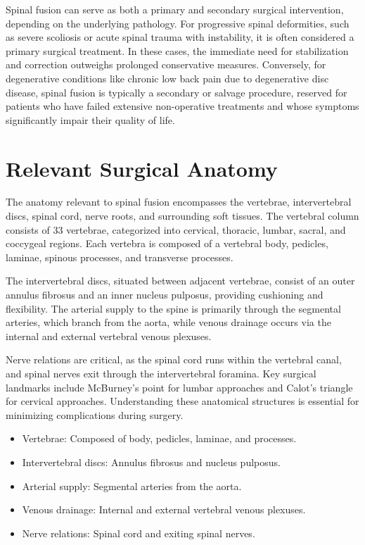 Spinal fusion can serve as both a primary and secondary surgical intervention, depending on the underlying pathology. For progressive spinal deformities, such as severe scoliosis or acute spinal trauma with instability, it is often considered a primary surgical treatment. In these cases, the immediate need for stabilization and correction outweighs prolonged conservative measures. Conversely, for degenerative conditions like chronic low back pain due to degenerative disc disease, spinal fusion is typically a secondary or salvage procedure, reserved for patients who have failed extensive non-operative treatments and whose symptoms significantly impair their quality of life.

\section*{Relevant Surgical Anatomy}
The anatomy relevant to spinal fusion encompasses the vertebrae, intervertebral discs, spinal cord, nerve roots, and surrounding soft tissues. The vertebral column consists of 33 vertebrae, categorized into cervical, thoracic, lumbar, sacral, and coccygeal regions. Each vertebra is composed of a vertebral body, pedicles, laminae, spinous processes, and transverse processes. 

The intervertebral discs, situated between adjacent vertebrae, consist of an outer annulus fibrosus and an inner nucleus pulposus, providing cushioning and flexibility. The arterial supply to the spine is primarily through the segmental arteries, which branch from the aorta, while venous drainage occurs via the internal and external vertebral venous plexuses. 

Nerve relations are critical, as the spinal cord runs within the vertebral canal, and spinal nerves exit through the intervertebral foramina. Key surgical landmarks include McBurney's point for lumbar approaches and Calot's triangle for cervical approaches. Understanding these anatomical structures is essential for minimizing complications during surgery.

\begin{itemize}
  \item Vertebrae: Composed of body, pedicles, laminae, and processes.
  \item Intervertebral discs: Annulus fibrosus and nucleus pulposus.
  \item Arterial supply: Segmental arteries from the aorta.
  \item Venous drainage: Internal and external vertebral venous plexuses.
  \item Nerve relations: Spinal cord and exiting spinal nerves.
\end{itemize}

